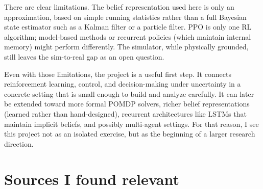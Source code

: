 \documentclass[11pt]{article}
\begin{document}
There are clear limitations. The belief representation used here is only an approximation, based on simple running statistics rather than a full Bayesian state estimator such as a Kalman filter or a particle filter. PPO is only one RL algorithm; model-based methods or recurrent policies (which maintain internal memory) might perform differently. The simulator, while physically grounded, still leaves the sim-to-real gap as an open question.

Even with those limitations, the project is a useful first step. It connects reinforcement learning, control, and decision-making under uncertainty in a concrete setting that is small enough to build and analyze carefully. It can later be extended toward more formal POMDP solvers, richer belief representations (learned rather than hand-designed), recurrent architectures like LSTMs that maintain implicit beliefs, and possibly multi-agent settings. For that reason, I see this project not as an isolated exercise, but as the beginning of a larger research direction.

\newpage

\section*{Sources I found relevant}
\end{document}
